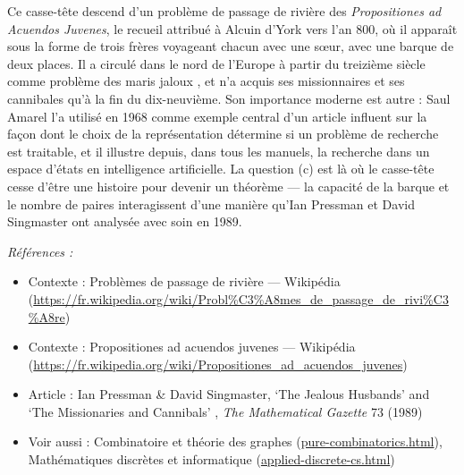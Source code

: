\documentclass[11pt]{article}
\newenvironment{refs}{\par\small\noindent\emph{Références :}\begin{itemize}\setlength\itemsep{0pt}}{\end{itemize}\normalsize}
\begin{document}
\noindent Ce casse-tête descend d'un problème de passage de rivière des \textit{Propositiones ad Acuendos Juvenes}, le recueil attribué à Alcuin d'York vers l'an 800, où il apparaît sous la forme de trois frères voyageant chacun avec une s\oe{}ur, avec une barque de deux places. Il a circulé dans le nord de l'Europe à partir du treizième siècle comme problème des \og{} maris jaloux \fg{}, et n'a acquis ses missionnaires et ses cannibales qu'à la fin du dix-neuvième. Son importance moderne est autre : Saul Amarel l'a utilisé en 1968 comme exemple central d'un article influent sur la façon dont le choix de la représentation détermine si un problème de recherche est traitable, et il illustre depuis, dans tous les manuels, la recherche dans un espace d'états en intelligence artificielle. La question (c) est là où le casse-tête cesse d'être une histoire pour devenir un théorème --- la capacité de la barque et le nombre de paires interagissent d'une manière qu'Ian Pressman et David Singmaster ont analysée avec soin en 1989.

\begin{refs}
\item Contexte : Problèmes de passage de rivière --- Wikipédia (\url{https://fr.wikipedia.org/wiki/Probl%C3%A8mes_de_passage_de_rivi%C3%A8re})
\item Contexte : Propositiones ad acuendos juvenes --- Wikipédia (\url{https://fr.wikipedia.org/wiki/Propositiones_ad_acuendos_juvenes})
\item Article : Ian Pressman \& David Singmaster, \og{} `The Jealous Husbands' and `The Missionaries and Cannibals' \fg{}, \textit{The Mathematical Gazette} 73 (1989)
\item Voir aussi : Combinatoire et théorie des graphes (\url{pure-combinatorics.html}), Mathématiques discrètes et informatique (\url{applied-discrete-cs.html})
\end{refs}

\bigskip
\end{document}
